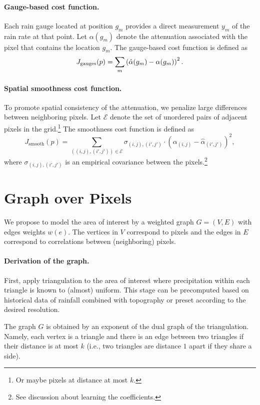 \documentclass[12pt]{article}
\begin{document}
\paragraph{Gauge-based cost function.}
Each rain gauge located at position $g_m$ provides a direct measurement $y_m$ of the rain rate at that point.
Let $\alpha(g_m)$ denote the attenuation associated with the pixel that contains the location $g_m$.
The gauge-based cost function is defined as
\[
J_{\text{gauges}}(p)
= \sum_{m}
\left(
\hat{\alpha}(g_m) - \alpha(g_m)
\right)^{2}.
\]

\paragraph{Spatial smoothness cost function.}
To promote spatial consistency of the attenuation, we penalize large differences between neighboring pixels.
Let $\mathcal{E}$ denote the set of unordered pairs of adjacent pixels in the grid.\footnote{Or maybe pixels at distance at most $k$.}
The smoothness cost function is defined as
\[
J_{\text{smooth}}(p)
= \sum_{((i,j),(i',j')) \in \mathcal{E}}
\sigma_{(i,j),(i',j')}
\cdot\left(
\alpha_{(i,j)} - \hat\alpha_{(i',j')}
\right)^{2},
\]
where $\sigma_{(i,j),(i',j')}$ is an empirical covariance between the pixels.\footnote{See discussion about learning the coefficients.}
\section{Graph over Pixels}

We propose to model the area of interest by a weighted graph $G=(V,E)$ with edges weights $w(e)$.
The vertices in $V$ correspond to pixels and the edges in $E$ correspond to correlations between (neighboring) pixels. 

\paragraph{Derivation of the graph.}
First, apply triangulation to the area of interest where precipitation within each triangle is known to (almost) uniform. This stage can be precomputed based on historical data of rainfall combined with topography or preset according to the desired resolution.

The graph $G$ is obtained by an exponent of the dual graph of the triangulation. Namely, each vertex is a triangle and there is an edge between two triangles if their distance is at most $k$ (i.e., two triangles are distance $1$ apart if  they share a side).
\end{document}

